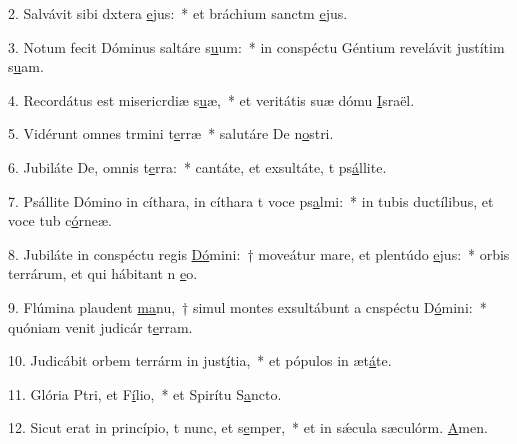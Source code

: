 2. Salvávit sibi dxtera \uline{e}jus:~* et bráchium sanctm \uline{e}jus.\par 
3. Notum fecit Dóminus saltáre s\uline{u}um:~* in conspéctu Géntium revelávit justítim s\uline{u}am.\par 
4. Recordátus est misericrdiæ s\uline{u}æ,~* et veritátis suæ dómu \uline{I}sraël.\par 
5. Vidérunt omnes trmini t\uline{e}rræ~* salutáre De n\uline{o}stri.\par 
6. Jubiláte De, omnis t\uline{e}rra:~* cantáte, et exsultáte, t ps\uline{á}llite.\par 
7. Psállite Dómino in cíthara, in cíthara t voce ps\uline{a}lmi:~* in tubis ductílibus, et voce tub c\uline{ó}rneæ.\par 
8. Jubiláte in conspéctu regis \uline{Dó}mini:~† moveátur mare, et plentúdo \uline{e}jus:~* orbis terrárum, et qui hábitant n \uline{e}o.\par 
9. Flúmina plaudent \uline{ma}nu,~† simul montes exsultábunt a cnspéctu D\uline{ó}mini:~* quóniam venit judicár t\uline{e}rram.\par 
10. Judicábit orbem terrárm in just\uline{í}tia,~* et pópulos in æt\uline{á}te.\par 
11. Glória Ptri, et F\uline{í}lio,~* et Spirítu S\uline{a}ncto.\par 
12. Sicut erat in princípio, t nunc, et s\uline{e}mper,~* et in sǽcula sæculórm. \uline{A}men.\par 
